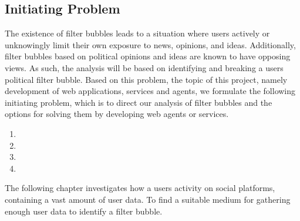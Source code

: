 \subsection*{Initiating Problem} The existence of filter bubbles leads to a
situation where users actively or unknowingly limit their own exposure to news,
opinions, and ideas. Additionally, filter bubbles based on political opinions
and ideas are known to have opposing views. As such, the analysis will be based
on identifying and breaking a users political filter bubble. Based on this
problem, the topic of this project, namely development of web applications,
services and agents, we formulate the following initiating problem, which is to
direct our analysis of filter bubbles and the options for solving them by
developing web agents or services.


\begin{center}
\begin{minipage}{0.95\linewidth}

\begin{enumerate}
  \item {}
  
  \item {}
  
  \item {}
  
  \item {}
  
\end{enumerate}

\end{minipage}
\end{center}

\nl \nl \nl 
The following chapter investigates how a users activity on social
platforms, containing a vast amount of user data. To find a suitable medium for
gathering enough user data to identify a filter bubble.

